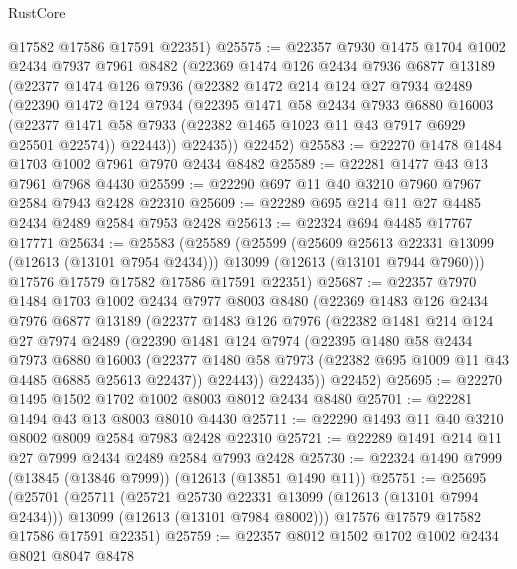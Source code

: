 \begin{lexlean}{RustCore}
\begin{coremodule}
      @17582
      @17586
      @17591
      @22351)
@25575 := @22357
    @7930
    @1475
    @1704
    @1002
    @2434
    @7937
    @7961
    @8482
    (@22369
      @1474
      @126
      @2434
      @7936
      @6877
      @13189
      (@22377
        @1474
        @126
        @7936
        (@22382
          @1472
          @214
          @124
          @27
          @7934
          @2489
          (@22390
            @1472
            @124
            @7934
            (@22395
              @1471
              @58
              @2434
              @7933
              @6880
              @16003
              (@22377 @1471 @58 @7933 (@22382 @1465 @1023 @11 @43 @7917 @6929 @25501 @22574))
              @22443))
          @22435))
      @22452)
@25583 := @22270 @1478 @1484 @1703 @1002 @7961 @7970 @2434 @8482
@25589 := @22281 @1477 @43 @13 @7961 @7968 @4430
@25599 := @22290 @697 @11 @40 @3210 @7960 @7967 @2584 @7943 @2428 @22310
@25609 := @22289 @695 @214 @11 @27 @4485 @2434 @2489 @2584 @7953 @2428
@25613 := @22324 @694 @4485 @17767 @17771
@25634 := @25583
    (@25589
      (@25599
        (@25609 @25613 @22331 @13099 (@12613 (@13101 @7954 @2434)))
        @13099
        (@12613 (@13101 @7944 @7960)))
      @17576
      @17579
      @17582
      @17586
      @17591
      @22351)
@25687 := @22357
    @7970
    @1484
    @1703
    @1002
    @2434
    @7977
    @8003
    @8480
    (@22369
      @1483
      @126
      @2434
      @7976
      @6877
      @13189
      (@22377
        @1483
        @126
        @7976
        (@22382
          @1481
          @214
          @124
          @27
          @7974
          @2489
          (@22390
            @1481
            @124
            @7974
            (@22395
              @1480
              @58
              @2434
              @7973
              @6880
              @16003
              (@22377 @1480 @58 @7973 (@22382 @695 @1009 @11 @43 @4485 @6885 @25613 @22437))
              @22443))
          @22435))
      @22452)
@25695 := @22270 @1495 @1502 @1702 @1002 @8003 @8012 @2434 @8480
@25701 := @22281 @1494 @43 @13 @8003 @8010 @4430
@25711 := @22290 @1493 @11 @40 @3210 @8002 @8009 @2584 @7983 @2428 @22310
@25721 := @22289 @1491 @214 @11 @27 @7999 @2434 @2489 @2584 @7993 @2428
@25730 := @22324 @1490 @7999 (@13845 (@13846 @7999)) (@12613 (@13851 @1490 @11))
@25751 := @25695
    (@25701
      (@25711
        (@25721 @25730 @22331 @13099 (@12613 (@13101 @7994 @2434)))
        @13099
        (@12613 (@13101 @7984 @8002)))
      @17576
      @17579
      @17582
      @17586
      @17591
      @22351)
@25759 := @22357 @8012 @1502 @1702 @1002 @2434 @8021 @8047 @8478

\end{coremodule}
\end{lexlean}
